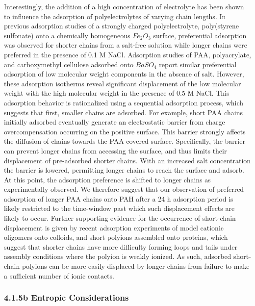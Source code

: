 \documentclass[journal=mamobx,manuscript=article]{achemso}
\begin{document}
Interestingly, the addition of a high concentration of electrolyte has been shown to influence the adsorption of polyelectrolytes of varying chain lengths.  In previous adsorption studies of a strongly charged polyelectrolyte, poly(styrene sulfonate) onto a chemically homogeneous $Fe_2O_3$ surface, preferential adsorption was observed for shorter chains from a salt-free solution while longer chains were preferred in the presence of 0.1 M NaCl.\cite{Ramachandran1987,Ramachandran1988}  Adsorption studies of PAA,\cite{Wright1987} polyacrylate,\cite{Bain1982} and carboxymethyl cellulose\cite{Bain1982} adsorbed onto $BaSO_4$ report similar preferential adsorption of low molecular weight components in the absence of salt.  However, these adsorption isotherms reveal significant displacement of the low molecular weight with the high molecular weight in the presence of 0.5 M NaCl.\cite{Bain1982} This adsorption behavior is rationalized using a sequential adsorption process, which suggests that first, smaller chains are adsorbed.\cite{DeLaat1995}  For example, short PAA chains initially adsorbed eventually generate an electrostatic barrier from charge overcompensation occurring on the positive surface.  This barrier strongly affects the diffusion of chains towards the PAA covered surface.  Specifically, the barrier can prevent longer chains from accessing the surface, and thus limits their displacement of pre-adsorbed shorter chains.  With an increased salt concentration the barrier is lowered, permitting longer chains to reach the surface and adsorb.  At this point, the adsorption preference is shifted to longer chains as experimentally observed.\cite{DeLaat1995}  We therefore suggest that our observation of preferred adsorption of longer PAA chains onto PAH after a 24 h adsorption period is likely restricted to the time-window past which such displacement effects are likely to occur.  Further supporting evidence for the occurrence of short-chain displacement is given by recent adsorption experiments of model cationic oligomers onto colloids,\cite{Shin2001} and short polyions assembled onto proteins,\cite{Houska2004} which suggest that shorter chains have more difficulty forming loops and tails under assembly conditions where the polyion is weakly ionized.  As such, adsorbed short-chain polyions can be more easily displaced by longer chains from failure to make a sufficient number of ionic contacts.  

\subsubsection{4.1.5b Entropic Considerations}
\end{document}

